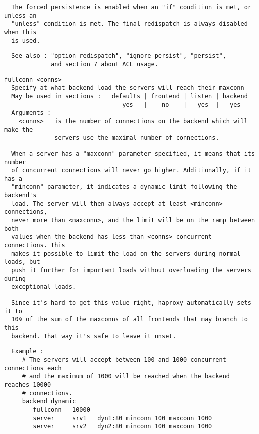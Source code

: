\begin{verbatim}
  The forced persistence is enabled when an "if" condition is met, or unless an
  "unless" condition is met. The final redispatch is always disabled when this
  is used.
\end{verbatim}

\begin{verbatim}
  See also : "option redispatch", "ignore-persist", "persist",
             and section 7 about ACL usage.
\end{verbatim}

\begin{verbatim}
fullconn <conns>
  Specify at what backend load the servers will reach their maxconn
  May be used in sections :   defaults | frontend | listen | backend
                                 yes   |    no    |   yes  |   yes
  Arguments :
    <conns>   is the number of connections on the backend which will make the
              servers use the maximal number of connections.
\end{verbatim}

\begin{verbatim}
  When a server has a "maxconn" parameter specified, it means that its number
  of concurrent connections will never go higher. Additionally, if it has a
  "minconn" parameter, it indicates a dynamic limit following the backend's
  load. The server will then always accept at least <minconn> connections,
  never more than <maxconn>, and the limit will be on the ramp between both
  values when the backend has less than <conns> concurrent connections. This
  makes it possible to limit the load on the servers during normal loads, but
  push it further for important loads without overloading the servers during
  exceptional loads.
\end{verbatim}

\begin{verbatim}
  Since it's hard to get this value right, haproxy automatically sets it to
  10% of the sum of the maxconns of all frontends that may branch to this
  backend. That way it's safe to leave it unset.
\end{verbatim}

\begin{verbatim}
  Example :
     # The servers will accept between 100 and 1000 concurrent connections each
     # and the maximum of 1000 will be reached when the backend reaches 10000
     # connections.
     backend dynamic
        fullconn   10000
        server     srv1   dyn1:80 minconn 100 maxconn 1000
        server     srv2   dyn2:80 minconn 100 maxconn 1000
\end{verbatim}

